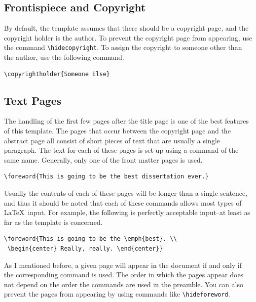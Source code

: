 \subsection{Frontispiece and Copyright}

By default, the template assumes that there should be a copyright page, and the copyright holder is the author.  
To prevent the copyright page from appearing, use the command \verb|\hidecopyright|.  
To assign the copyright to someone other than the author, use the following command.
\begin{verbatim}
\copyrightholder{Someone Else}
\end{verbatim}


\subsection{Text Pages}  \label{ssec:dedication}
The handling of the first few pages after the title page is one of the best features of this template.  
The pages that occur between the copyright page and the abstract page all consist of short pieces of text that are usually a single paragraph.  
The text for each of these pages is set up using a command of the same name.
Generally, only one of the front matter pages is used. 
\begin{verbatim}
\foreword{This is going to be the best dissertation ever.}
\end{verbatim}
Usually the contents of each of these pages will be longer than a single sentence, and thus it should be noted that each of these commands allows most types of \LaTeX~input.  
For example, the following is perfectly acceptable input--at least as far as the template is concerned.
\begin{verbatim}
\foreword{This is going to be the \emph{best}. \\
 \begin{center} Really, really. \end{center}}
\end{verbatim}

As I mentioned before, a given page will appear in the document if and only if the corresponding command is used.  
The order in which the pages appear does not depend on the order the commands are used in the preamble.  
You can also prevent the pages from appearing by using commands like \verb|\hideforeword|.

